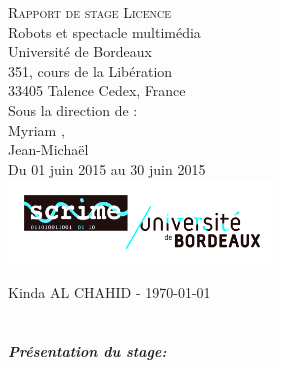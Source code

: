 \documentclass[10pt,a4paper]{report}
\begin{document}
\begin{titlepage} 
\begin{center}

        \textsc{\Huge Rapport de stage Licence}\\[1cm]
        {\huge Robots et spectacle multimédia}\\[1cm]
        {\Large Université de Bordeaux \\ 
351, cours de la Libération\\ 33405 Talence Cedex, France}\\[1cm]
        {\Large Sous la direction de : \\}
        {\Large Myriam ,\\
         Jean-Michaël }\\[1cm]
         {\Large Du 01 juin 2015 au 30 juin 2015\\}
    		\includegraphics[width=7cm]{image/scrime.jpg} 	
 
\end{center}

    \begin{flushbottom}
        \begin{flushleft}
            \large Kinda \textsc{AL CHAHID} - \today \\
        \end{flushleft}
    \end{flushbottom}

\end{titlepage}




\tableofcontents
{}

\printglossary[type=\acronymtype]


\chapter*{}
\paragraph{Présentation du stage:}
\end{document}
